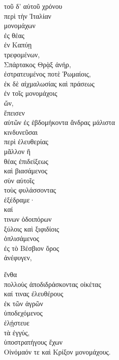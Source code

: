 {\large
\begin{greek}
\noindent  τοῦ δ' αὐτοῦ χρόνου \\
περὶ τὴν Ἰταλίαν \\
μονομάχων \\
\tabto{2em} ἐς θέας \\
\tabto{2em} ἐν Καπύῃ \\
τρεφομένων, \\
Σπάρτακος Θρᾲξ ἀνήρ, \\
\tabto{2em} ἐστρατευμένος ποτὲ Ῥωμαίοις, \\
\tabto{2em} ἐκ δὲ αἰχμαλωσίας καὶ πράσεως \\
\tabto{4em} ἐν τοῖς μονομάχοις \\
\tabto{6em} ὤν, \\
ἔπεισεν \\
\tabto{2em} αὐτῶν ἐς ἑβδομήκοντα ἄνδρας μάλιστα \\
\tabto{2em} κινδυνεῦσαι \\
\tabto{4em} περὶ ἐλευθερίας \\
\tabto{6em} μᾶλλον ἢ \\
\tabto{8em} θέας ἐπιδείξεως \\
καὶ βιασάμενος \\
\tabto{4em} σὺν αὐτοῖς \\
\tabto{2em} τοὺς φυλάσσοντας \\
ἐξέδραμε· \\
καί \\
\tabto{4em} τινων ὁδοιπόρων \\
\tabto{2em} ξύλοις καὶ ξιφιδίοις \\
ὁπλισάμενος \\
\tabto{2em} ἐς τὸ Βέσβιον ὄρος \\
ἀνέφυγεν,

\tabto{2em} ἔνθα \\
\tabto{4em} πολλοὺς ἀποδιδράσκοντας οἰκέτας \\
\tabto{4em} καί τινας ἐλευθέρους \\
\tabto{6em} ἐκ τῶν ἀγρῶν \\
\tabto{2em} ὑποδεχόμενος \\
\tabto{2em} ἐλῄστευε \\
\tabto{4em} τὰ ἐγγύς, \\
\tabto{2em} ὑποστρατήγους ἔχων \\
\tabto{4em} Οἰνόμαόν τε καὶ Κρίξον μονομάχους. \\

\end{greek}
}

